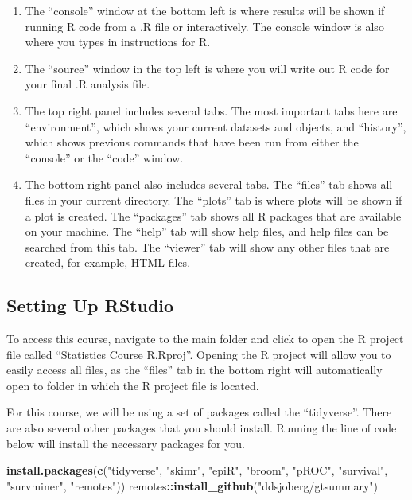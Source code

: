\documentclass[]{book}
\newenvironment{Shaded}{\begin{snugshade}}{\end{snugshade}}
\newcommand{\KeywordTok}[1]{\textcolor[rgb]{0.13,0.29,0.53}{\textbf{#1}}}
\newcommand{\NormalTok}[1]{#1}
\newcommand{\OperatorTok}[1]{\textcolor[rgb]{0.81,0.36,0.00}{\textbf{#1}}}
\newcommand{\StringTok}[1]{\textcolor[rgb]{0.31,0.60,0.02}{#1}}
\begin{document}
\begin{enumerate}
\def\labelenumi{\arabic{enumi}.}
\item
  The ``console'' window at the bottom left is where results will be shown if running R code from a .R file or interactively. The console window is also where you types in instructions for R.
\item
  The ``source'' window in the top left is where you will write out R code for your final .R analysis file.
\item
  The top right panel includes several tabs. The most important tabs here are ``environment'', which shows your current datasets and objects, and ``history'', which shows previous commands that have been run from either the ``console'' or the ``code'' window.
\item
  The bottom right panel also includes several tabs. The ``files'' tab shows all files in your current directory. The ``plots'' tab is where plots will be shown if a plot is created. The ``packages'' tab shows all R packages that are available on your machine. The ``help'' tab will show help files, and help files can be searched from this tab. The ``viewer'' tab will show any other files that are created, for example, HTML files.
\end{enumerate}

\hypertarget{setting-up-rstudio}{%
\subsection{Setting Up RStudio}\label{setting-up-rstudio}}

To access this course, navigate to the main folder and click to open the R project file called ``Statistics Course R.Rproj''. Opening the R project will allow you to easily access all files, as the ``files'' tab in the bottom right will automatically open to folder in which the R project file is located.

For this course, we will be using a set of packages called the ``tidyverse''. There are also several other packages that you should install. Running the line of code below will install the necessary packages for you.

\begin{Shaded}
\begin{Highlighting}[]
\KeywordTok{install.packages}\NormalTok{(}\KeywordTok{c}\NormalTok{(}\StringTok{"tidyverse"}\NormalTok{, }\StringTok{"skimr"}\NormalTok{, }\StringTok{"epiR"}\NormalTok{, }\StringTok{"broom"}\NormalTok{, }\StringTok{"pROC"}\NormalTok{, }\StringTok{"survival"}\NormalTok{, }\StringTok{"survminer"}\NormalTok{, }\StringTok{"remotes"}\NormalTok{))}
\NormalTok{remotes}\OperatorTok{::}\KeywordTok{install_github}\NormalTok{(}\StringTok{"ddsjoberg/gtsummary"}\NormalTok{)}
\end{Highlighting}
\end{Shaded}
\end{document}
